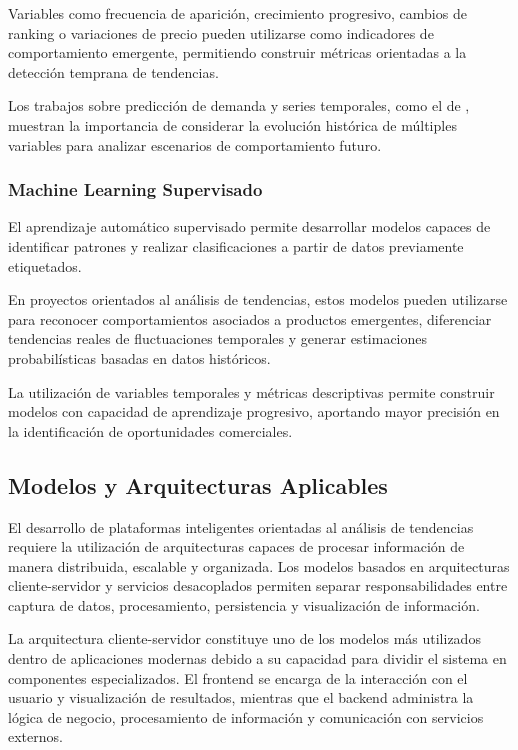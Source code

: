 Variables como frecuencia de aparición, crecimiento progresivo, cambios de ranking o variaciones de precio pueden utilizarse como indicadores de comportamiento emergente, permitiendo construir métricas orientadas a la detección temprana de tendencias.

Los trabajos sobre predicción de demanda y series temporales, como el de \textcite{LimArikLoeffPfister2021}, muestran la importancia de considerar la evolución histórica de múltiples variables para analizar escenarios de comportamiento futuro.

\subsubsection{Machine Learning Supervisado}

El aprendizaje automático supervisado permite desarrollar modelos capaces de identificar patrones y realizar clasificaciones a partir de datos previamente etiquetados.

En proyectos orientados al análisis de tendencias, estos modelos pueden utilizarse para reconocer comportamientos asociados a productos emergentes, diferenciar tendencias reales de fluctuaciones temporales y generar estimaciones probabilísticas basadas en datos históricos.

La utilización de variables temporales y métricas descriptivas permite construir modelos con capacidad de aprendizaje progresivo, aportando mayor precisión en la identificación de oportunidades comerciales.

\subsection{Modelos y Arquitecturas Aplicables}

El desarrollo de plataformas inteligentes orientadas al análisis de tendencias requiere la utilización de arquitecturas capaces de procesar información de manera distribuida, escalable y organizada. Los modelos basados en arquitecturas cliente-servidor y servicios desacoplados permiten separar responsabilidades entre captura de datos, procesamiento, persistencia y visualización de información.

La arquitectura cliente-servidor constituye uno de los modelos más utilizados dentro de aplicaciones modernas debido a su capacidad para dividir el sistema en componentes especializados. El frontend se encarga de la interacción con el usuario y visualización de resultados, mientras que el backend administra la lógica de negocio, procesamiento de información y comunicación con servicios externos.

